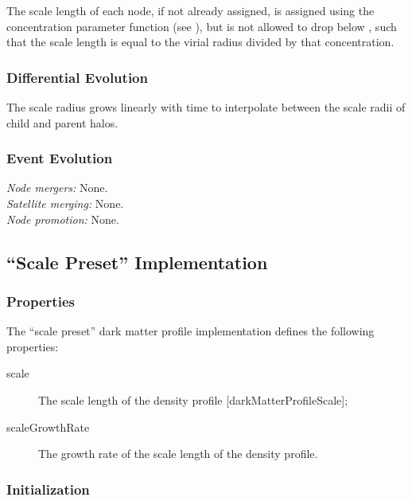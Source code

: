 The scale length of each node, if not already assigned, is assigned using the concentration parameter function (see ), but is not allowed to drop below {\normalfont \ttfamily [darkMatterProfileMinimumConcentration]}, such that the scale length is equal to the virial radius divided by that concentration.

\subsubsection{Differential Evolution}

The scale radius grows linearly with time to interpolate between the scale radii of child and parent halos.

\subsubsection{Event Evolution}

\noindent\emph{Node mergers:} None.\\

\noindent\emph{Satellite merging:} None.\\

\noindent\emph{Node promotion:} None.\\

\subsection{``Scale Preset'' Implementation}\label{sec:DarkMatterProfileScalePreset}

\subsubsection{Properties}

The ``scale preset'' dark matter profile implementation defines the following properties:
\begin{description}
 \item [{\normalfont \ttfamily scale}] The scale length of the density profile [{\normalfont \ttfamily darkMatterProfileScale}];
 \item [{\normalfont \ttfamily scaleGrowthRate}] The growth rate of the scale length of the density profile.
\end{description}

\subsubsection{Initialization}

